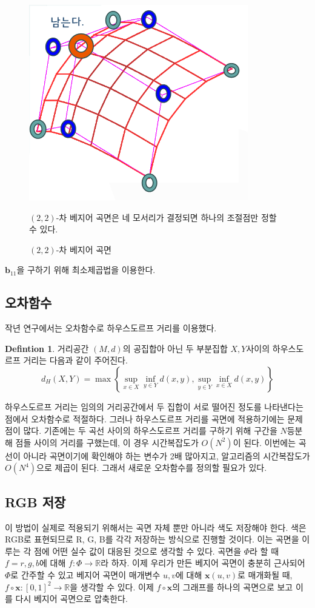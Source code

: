\documentclass[10pt]{gshs-report-v2.0}
\theoremstyle{theorem}
\theoremstyle{lemma}
\theoremstyle{definition}
\newtheorem{definition}[theorem]{Defintion}
\begin{document}
\begin{figure}[h]
	\centering
	\includegraphics[width=.5\textwidth]{22BS}
	\caption{$(2,2)$-차 베지어 곡면}
	\small $(2,2)$-차 베지어 곡면은 네 모서리가 결정되면 하나의 조절점만 정할 수 있다. 
\end{figure}

$\mathbf{b}_{11}$을 구하기 위해 최소제곱법을 이용한다. 

\subsection{오차함수}
작년 연구에서는 오차함수로 하우스도르프 거리를 이용했다.
\begin{definition}
	거리공간 $(M, d)$의 공집합아 아닌 두 부분집합 $X, Y$사이의 하우스도르프 거리는 다음과 같이 주어진다.\cite{Munkres}
	\begin{equation} \label{hausdorff}
		d_H(X, Y)=\max\left\{\sup_{x\in X}\inf_{y\in Y} d(x, y), \sup_{y\in Y}\inf_{x\in X} d(x, y)\right\}
	\end{equation}
\end{definition}

하우스도르프 거리는 임의의 거리공간에서 두 집합이 서로 떨어진 정도를 나타낸다는 점에서 오차함수로 적절하다.\cite{last year} 그러나 하우스도르프 거리를 곡면에 적용하기에는 문제점이 많다. 기존에는 두 곡선 사이의 하우스도르프 거리를 구하기 위해 구간을 $N$등분해 점들 사이의 거리를 구했는데, 이 경우 시간복잡도가 $O(N^2)$이 된다. 이번에는 곡선이 아니라 곡면이기에 확인해야 하는 변수가 2배 많아지고, 알고리즘의 시간복잡도가 $O(N^4)$으로 제곱이 된다. 그래서 새로운 오차함수를 정의할 필요가 있다. 

\subsection{RGB 저장}
이 방법이 실제로 적용되기 위해서는 곡면 자체 뿐만 아니라 색도 저장해야 한다. 색은 RGB로 표현되므로 R, G, B를 각각 저장하는 방식으로 진행할 것이다. 이는 곡면을 이루는 각 점에 어떤 실수 값이 대응된 것으로 생각할 수 있다. 곡면을 $\Phi$라 할 때 $f=r, g, b$에 대해 $f:\Phi\rightarrow\mathbb{R}$라 하자. 이제 우리가 만든 베지어 곡면이 충분히 근사되어 $\Phi$로 간주할 수 있고 베지어 곡면이 매개변수 $u, v$에 대해 $\mathbf{x}(u, v)$로 매개화될 때, $f\circ\mathbf{x}:[0, 1]^2\rightarrow\mathbb{R}$을 생각할 수 있다. 이제 $f\circ\mathbf{x}$의 그래프를 하나의 곡면으로 보고 이를 다시 베지어 곡면으로 압축한다. 
\end{document}
